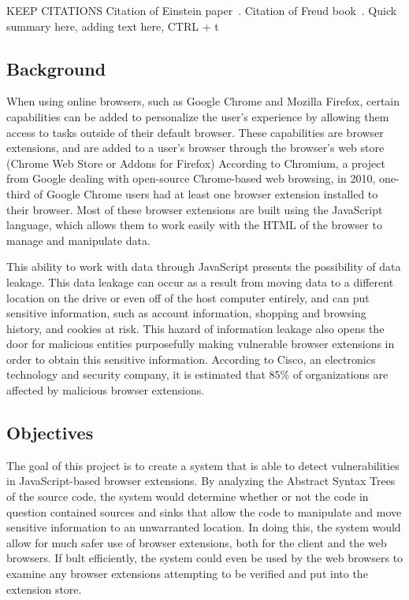 \documentclass[jou,apacite]{apa6}
\begin{document}
KEEP CITATIONS Citation of Einstein paper~\cite{Einstein}. Citation of Freud book~\cite{Freud}. Quick summary here, adding text here, CTRL + t

	\subsection{Background}

		When using online browsers, such as Google Chrome and Mozilla Firefox, certain capabilities can be added to personalize the user’s experience by allowing them access to tasks outside of their default browser.  These capabilities are browser extensions, and are added to a user’s browser through the browser’s web store (Chrome Web Store or Addons for Firefox) According to Chromium, a project from Google dealing with open-source Chrome-based web browsing, in 2010, one-third of Google Chrome users had at least one browser extension installed to their browser.  Most of these browser extensions are built using the JavaScript language, which allows them to work easily with the HTML of the browser to manage and manipulate data.

		This ability to work with data through JavaScript presents the possibility of data leakage. This data leakage can occur as a result from moving data to a different location on the drive or even off of the host computer entirely, and can put sensitive information, such as account information, shopping and browsing history, and cookies at risk. This hazard of information leakage also opens the door for malicious entities purposefully making vulnerable browser extensions in order to obtain this sensitive information.  According to Cisco, an electronics technology and security company, it is estimated that 85\% of organizations are affected by malicious browser extensions.

	\subsection{Objectives}

		The goal of this project is to create a system that is able to detect vulnerabilities in JavaScript-based browser extensions.  By analyzing the Abstract Syntax Trees of the source code, the system would determine whether or not the code in question contained sources and sinks that allow the code to manipulate and move sensitive information to an unwarranted location.  In doing this, the system would allow for much safer use of browser extensions, both for the client and the web browsers.  If bult efficiently, the system could even be used by the web browsers to examine any browser extensions attempting to be verified and put into the extension store.
\end{document}
